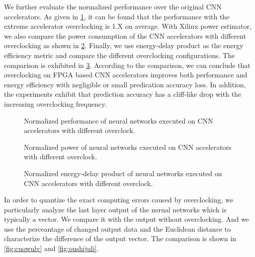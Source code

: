 We further evaluate the normalized performance over the original CNN accelerators.
As given in \ref{fig:relative_time_overclock}, it can be found that the performance with the extreme accelerator 
overclocking is 1.X on average. With Xilinx power estimator, we also compare the 
power consumption of the CNN accelerators with different overclocking as shown in \ref{fig:relative_power_overclock}.
Finally, we use energy-delay product as the energy efficiency metric and compare the 
different overclocking configurations. The comparison is exhibited in \ref{fig:relative_energy_overclock}.
According to the comparison, we can conclude that overclocking on FPGA based CNN 
accelerators improves both performance and energy efficiency with negligible or small 
predication accuracy loss. In addition, the experiments exhibit that prediction 
accuracy has a cliff-like drop with the increasing overclocking frequency. 

\begin{figure}
    \caption{Normalized performance of neural networks executed on CNN accelerators with different overclock.}
\label{fig:relative_time_overclock}
\vspace{-1em}
\end{figure}

\begin{figure}
    \caption{Normalized power of neural networks executed on CNN accelerators with different overclock.}
\label{fig:relative_power_overclock}
\vspace{-1em}
\end{figure}

\begin{figure}
    \caption{Normalized energy-delay product of neural networks executed on CNN accelerators with different overclock.}
\label{fig:relative_energy_overclock}
\vspace{-1em}
\end{figure}

In order to quantize the exact computing errors caused by overclocking, we 
particularly analyze the last layer output of the nerual networks which 
is typically a vector. We compare it with the output without overclocking.
And we use the perceantage of changed output data and the Euclidean distance to 
characterize the difference of the output vector. 
The comparison is shown in \ref{fig:cuowulv} and \ref{fig:oushijuli}.

